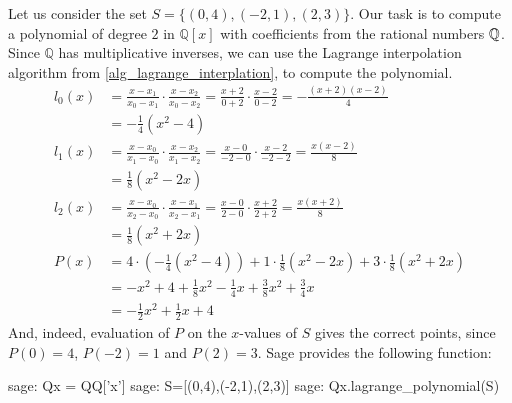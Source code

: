 \begin{example} Let us consider the set $S=\{(0,4),(-2,1),(2,3)\}$. Our task is to compute a polynomial of degree $2$ in $\mathbb{Q}[x]$ with coefficients from the rational numbers $\mathbb{Q}$. Since $\mathbb{Q}$ has multiplicative inverses, we can use the Lagrange interpolation algorithm from \ref{alg_lagrange_interplation}, to compute the polynomial.
\begin{align*}
l_0(x) & = \frac{x-x_1}{x_0-x_1}\cdot\frac{x-x_2}{x_0-x_2}
         = \frac{x+2}{0+2}\cdot\frac{x-2}{0-2}
         =  -\frac{(x+2)(x-2)}{4}\\
       & = -\frac{1}{4}(x^2-4)\\
l_1(x) & = \frac{x-x_0}{x_1-x_0}\cdot\frac{x-x_2}{x_1-x_2}
          = \frac{x-0}{-2-0}\cdot \frac{x-2}{-2-2}
          = \frac{x(x-2)}{8}\\
       & = \frac{1}{8}(x^2-2x)\\
l_2(x) & = \frac{x-x_0}{x_2-x_0}\cdot\frac{x-x_1}{x_2-x_1}
          = \frac{x-0}{2-0}\cdot\frac{x+2}{2+2}
          = \frac{x(x+2)}{8}\\
       & = \frac{1}{8}(x^2+2x)\\
P(x)   & =  4\cdot (-\frac{1}{4}(x^2-4)) + 1\cdot \frac{1}{8}(x^2-2x) + 3\cdot \frac{1}{8}(x^2+2x)\\
       & = -x^2+4 + \frac{1}{8}x^2-\frac{1}{4} x + \frac{3}{8}x^2+\frac{3}{4} x \\
       & = -\frac{1}{2} x^2 +\frac{1}{2} x + 4
\end{align*}
And, indeed, evaluation of $P$ on the $x$-values of $S$ gives the correct points, since $P(0)=4$, $P(-2)=1$ and $P(2)=3$. Sage provides the following function:
\begin{sagecommandline}
sage: Qx = QQ['x']
sage: S=[(0,4),(-2,1),(2,3)]
sage: Qx.lagrange_polynomial(S)
\end{sagecommandline}
\end{example}
